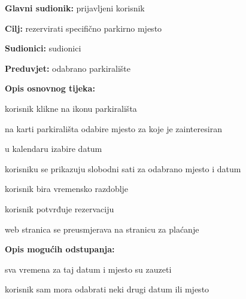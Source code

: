 \begin{packed_enum}
\begin{packed_item}
						 
					\end{packed_item}
					
					\noindent {}
					\begin{packed_item}
						
						\item \textbf{Glavni sudionik: }prijavljeni korisnik
						\item  \textbf{Cilj:} rezervirati specifično parkirno mjesto
						\item  \textbf{Sudionici:} sudionici
						\item  \textbf{Preduvjet:} odabrano parkiralište
						\item  \textbf{Opis osnovnog tijeka:}
						
						\item[] \begin{packed_enum}
							
							\item korisnik klikne na ikonu parkirališta
							\item na karti parkirališta odabire mjesto za koje je zainteresiran
							\item u kalendaru izabire datum
							\item korisniku se prikazuju slobodni sati za odabrano mjesto i datum
							\item korisnik bira vremensko razdoblje
							\item korisnik potvrđuje rezervaciju
							\item web stranica se preusmjerava na stranicu za plaćanje
						\end{packed_enum}
						
						\item  \textbf{Opis mogućih odstupanja:}
						
						\item[] \begin{packed_item}
							
							\item[4.a] sva vremena za taj datum i mjesto su zauzeti
							\item[] \begin{packed_enum}
								
								\item korisnik sam mora odabrati neki drugi datum ili mjesto
								
							\end{packed_enum}
							

\end{packed_item}
\end{packed_item}
\end{packed_enum}

